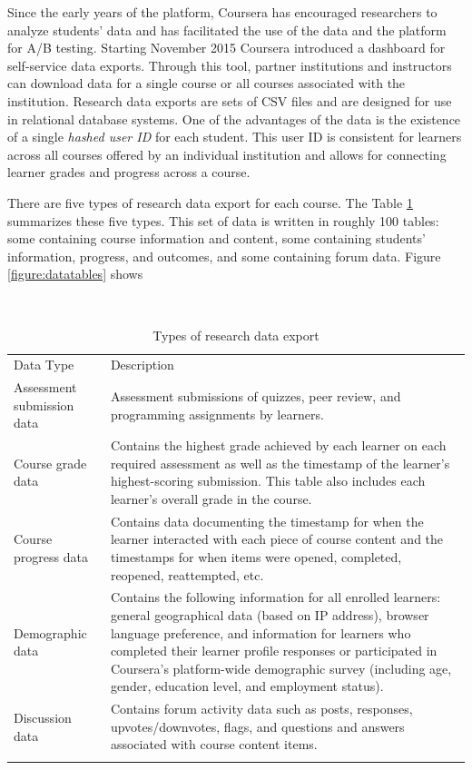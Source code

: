 Since the early years of the platform, Coursera has encouraged
researchers to analyze students' data and has facilitated the use of the
data and the platform for A/B testing. Starting November 2015 Coursera
introduced a dashboard for self-service data exports. Through this tool,
partner institutions and instructors can download data for a single
course or all courses associated with the institution. Research data
exports are sets of CSV files and are designed for use in relational
database systems. One of the advantages of the data is the existence of
a single \emph{hashed user ID} for each student. This user ID is
consistent for learners across all courses offered by an individual
institution and allows for connecting learner grades and progress across
a course.

There are five types of research data export for each course. The Table
\ref{tab:datatypes} summarizes these five types. This set of data is
written in roughly 100 tables: some containing course information and
content, some containing students' information, progress, and outcomes,
and some containing forum data. Figure \ref{figure:datatables} shows

\begin{table}
\footnotesize
\caption{Types of research data export}\
\centering
\label{tab:datatypes}
\begin{tabular}{p{4cm}|p{7cm}}
Data Type & Description \\
\addlinespace
\toprule
Assessment submission data & Assessment submissions of quizzes, peer review, and programming assignments by learners.\\
\midrule
Course grade data & Contains the highest grade achieved by each learner on each required assessment as well as the timestamp of the learner's highest-scoring submission. This table also includes each learner's overall grade in the course.\\
\midrule
Course progress data & Contains data documenting the timestamp for when the learner interacted with each piece of course content and the timestamps for when items were opened, completed, reopened, reattempted, etc.\\
\midrule
Demographic data & Contains the following information for all enrolled learners: general geographical data (based on IP address), browser language preference, and information for learners who completed their learner profile responses or participated in Coursera's platform-wide demographic survey (including age, gender, education level, and employment status).\\
\midrule
Discussion data & Contains forum activity data such as posts, responses, upvotes/downvotes, flags, and questions and answers associated with course content items.\\
\addlinespace
\bottomrule
\end{tabular}
\end{table}

